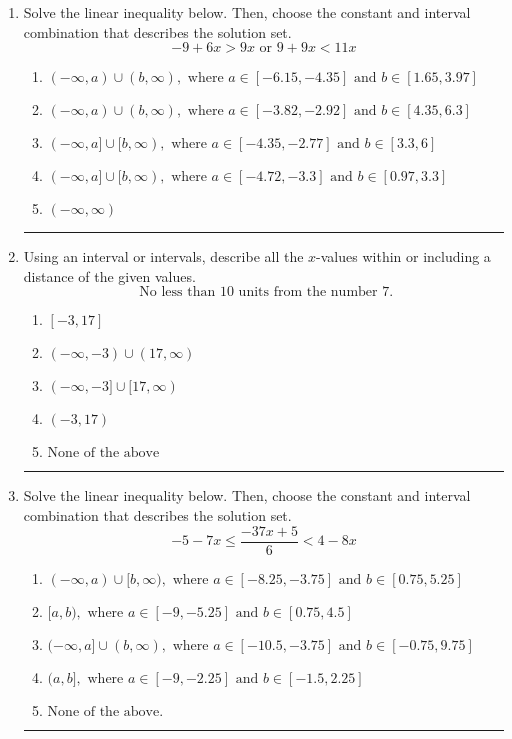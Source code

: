 \documentclass[14pt]{extbook}
\newcommand{\litem}[1]{\item#1\hspace*{-1cm}\rule{\textwidth}{0.4pt}}
\begin{document}
\begin{enumerate}
{\begin{enumerate}[label=\Alph*.]
\end{enumerate} }
\litem{
Solve the linear inequality below. Then, choose the constant and interval combination that describes the solution set.\[ -9 + 6 x > 9 x \text{ or } 9 + 9 x < 11 x \]\begin{enumerate}[label=\Alph*.]
\item \( (-\infty, a) \cup (b, \infty), \text{ where } a \in [-6.15, -4.35] \text{ and } b \in [1.65, 3.97] \)
\item \( (-\infty, a) \cup (b, \infty), \text{ where } a \in [-3.82, -2.92] \text{ and } b \in [4.35, 6.3] \)
\item \( (-\infty, a] \cup [b, \infty), \text{ where } a \in [-4.35, -2.77] \text{ and } b \in [3.3, 6] \)
\item \( (-\infty, a] \cup [b, \infty), \text{ where } a \in [-4.72, -3.3] \text{ and } b \in [0.97, 3.3] \)
\item \( (-\infty, \infty) \)

\end{enumerate} }
\litem{
Using an interval or intervals, describe all the $x$-values within or including a distance of the given values.\[ \text{ No less than } 10 \text{ units from the number } 7. \]\begin{enumerate}[label=\Alph*.]
\item \( [-3, 17] \)
\item \( (-\infty, -3) \cup (17, \infty) \)
\item \( (-\infty, -3] \cup [17, \infty) \)
\item \( (-3, 17) \)
\item \( \text{None of the above} \)

\end{enumerate} }
\litem{
Solve the linear inequality below. Then, choose the constant and interval combination that describes the solution set.\[ -5 - 7 x \leq \frac{-37 x + 5}{6} < 4 - 8 x \]\begin{enumerate}[label=\Alph*.]
\item \( (-\infty, a) \cup [b, \infty), \text{ where } a \in [-8.25, -3.75] \text{ and } b \in [0.75, 5.25] \)
\item \( [a, b), \text{ where } a \in [-9, -5.25] \text{ and } b \in [0.75, 4.5] \)
\item \( (-\infty, a] \cup (b, \infty), \text{ where } a \in [-10.5, -3.75] \text{ and } b \in [-0.75, 9.75] \)
\item \( (a, b], \text{ where } a \in [-9, -2.25] \text{ and } b \in [-1.5, 2.25] \)
\item \( \text{None of the above.} \)


\end{enumerate}}
\end{enumerate}
\end{document}
